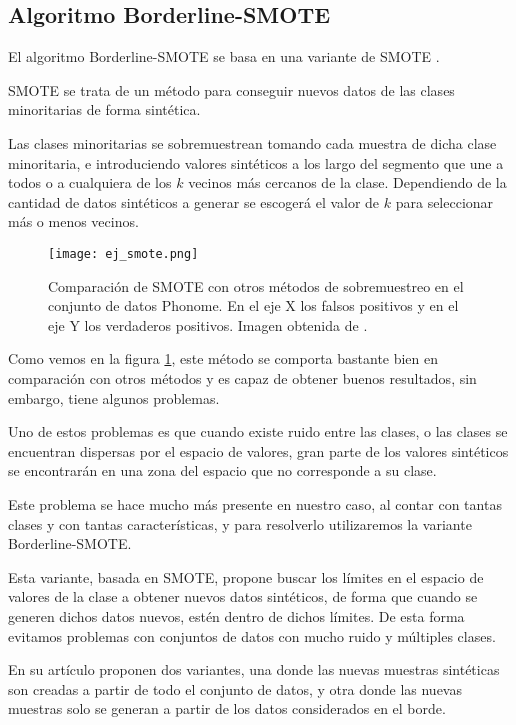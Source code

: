 \subsection{Algoritmo Borderline-SMOTE}

El algoritmo Borderline-SMOTE \cite{BL-SMOTE} se basa en una variante de SMOTE \cite{SMOTE}.

SMOTE se trata de un método para conseguir nuevos datos de las clases minoritarias de forma sintética.

Las clases minoritarias se sobremuestrean tomando cada muestra de dicha clase minoritaria, e introduciendo valores sintéticos a los largo del segmento que une a todos o a cualquiera de los $k$ vecinos más cercanos de la clase. Dependiendo de la cantidad de datos sintéticos a generar se escogerá el valor de $k$ para seleccionar más o menos vecinos.


\begin{figure}[H]
	\centering
	\texttt{[image: ej\_smote.png]}
	\caption{Comparación de SMOTE con otros métodos de sobremuestreo en el conjunto de datos Phonome. En el eje X los falsos positivos y en el eje Y los verdaderos positivos. Imagen obtenida de \cite{SMOTE}.}
	\label{fig:comparacionSMOTE}
\end{figure}

Como vemos en la figura \ref{fig:comparacionSMOTE}, este método se comporta bastante bien en comparación con otros métodos y es capaz de obtener buenos resultados, sin embargo, tiene algunos problemas.

Uno de estos problemas es que cuando existe ruido entre las clases, o las clases se encuentran dispersas por el espacio de valores, gran parte de los valores sintéticos se encontrarán en una zona del espacio que no corresponde a su clase.

Este problema se hace mucho más presente en nuestro caso, al contar con tantas clases y con tantas características, y para resolverlo utilizaremos la variante Borderline-SMOTE.

Esta variante, basada en SMOTE, propone buscar los límites en el espacio de valores de la clase a obtener nuevos datos sintéticos, de forma que cuando se generen dichos datos nuevos, estén dentro de dichos límites. De esta forma evitamos problemas con conjuntos de datos con mucho ruido y múltiples clases.

En su artículo proponen dos variantes, una donde las nuevas muestras sintéticas son creadas a partir de todo el conjunto de datos, y otra donde las nuevas muestras solo se generan a partir de los datos considerados en el borde.



